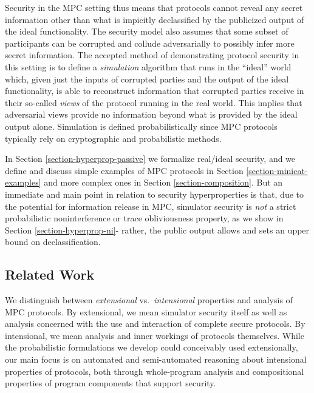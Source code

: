 Security in the MPC setting thus means that protocols cannot reveal
any secret information other than what is impicitly declassified by
the publicized output of the ideal functionality. The security model
also assumes that some subset of participants can be corrupted and
collude adversarially to possibly infer more secret information. The
accepted method of demonstrating protocol security in this setting is
to define a \emph{simulation} algorithm that runs in the ``ideal''
world which, given just the inputs of corrupted parties and the output
of the ideal functionality, is able to reconstruct information that
corrupted parties receive in their so-called \emph{views} of the
protocol running in the real world.  This implies that adversarial
views provide no information beyond what is provided by the ideal
output alone. Simulation is defined probabilistically since MPC
protocols typically rely on cryptographic and probabilistic methods.

In Section \ref{section-hyperprop-passive} we formalize real/ideal
security, and we define and discuss simple examples of MPC protocols
in Section \ref{section-minicat-examples} and more complex ones in
Section \ref{section-composition}. But an immediate and main point in
relation to security hyperproperties is that, due to the potential for
information release in MPC, simulator security is \emph{not} a strict
probabilistic noninterference or trace obliviousness property, as we
show in Section \ref{section-hyperprop-ni}- rather, the public output
allows and sets an upper bound on declassification.

\subsection{Related Work}

We distinguish between \emph{extensional} vs.~\emph{intensional}
properties and analysis of MPC protocols. By extensional, we mean
simulator security itself as well as analysis concerned with the use
and interaction of complete secure protocols. By intensional, we mean
analysis and inner workings of protocols themselves. While the
probabilistic formulations we develop could conceivably used
extensionally, our main focus is on automated and semi-automated
reasoning about intensional properties of protocols, both through
whole-program analysis and compositional properties of program
components that support security. 

